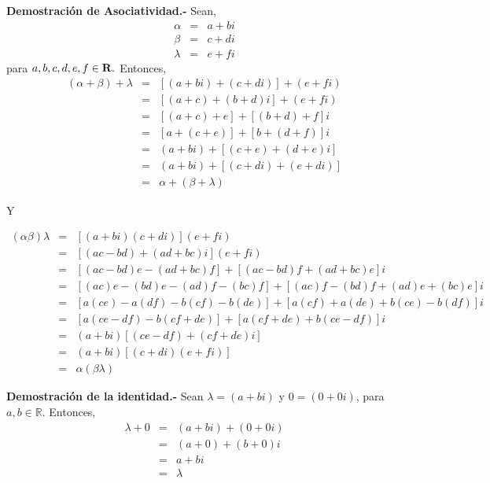 \textbf{Demostración de Asociatividad.-}\; Sean,
$$\begin{array}{rcl}
    \alpha & = & a+bi\\
    \beta & = & c+di\\
    \lambda & = & e+fi
\end{array}$$
para $a,b,c,d,e,f \in \bf{R}.$ Entonces,
$$\begin{array}{rcl}
    (\alpha + \beta )+\lambda & = & \left[(a+bi)+(c+di)\right]+(e+fi)\\
			      & = & \left[(a+c)+(b+d)i\right] + (e+fi)\\
			      & = & \left[(a+c)+e\right]+\left[(b+d)+f\right]i\\
			      & = & \left[a+(c+e)\right]+\left[b+(d+f)\right]i\\
			      & = & (a+bi) + \left[(c+e)+(d+e)i\right]\\
			      & = & (a+bi) + \left[(c+di)+(e+di)\right]\\
			      & = & \alpha + (\beta + \lambda)
\end{array}$$

Y

$$\begin{array}{rcl}
    (\alpha\beta)\lambda &=& \left[(a+bi)(c+di)\right](e+fi)\\
			 &=&\left[(ac-bd)+(ad+bc)i\right](e+fi)\\
			 &=&\left[(ac-bd)e-(ad+bc)f\right]+\left[(ac-bd)f+(ad+bc)e\right]i\\
			 &=&\left[(ac)e-(bd)e-(ad)f-(bc)f\right]+\left[(ac)f-(bd)f+(ad)e+(bc)e\right]i\\
			 &=&\left[a(ce)-a(df)-b(cf)-b(de)\right]+\left[a(cf)+a(de)+b(ce)-b(df)\right]i\\
			 &=&\left[a(ce-df)-b(cf+de)\right]+\left[a(cf+de)+b(ce-df)\right]i\\
			 &=&(a+bi)\left[(ce-df)+(cf+de)i\right]\\
			 &=&(a+bi)\left[(c+di)(e+fi)\right]\\
			 &=&\alpha(\beta\lambda)
\end{array}$$



\vspace{0.5cm}

\textbf{Demostración de la identidad.-}\; Sean $\lambda=(a+bi)$ y $0=(0+0i)$, para $a,b\in \mathbb{R}$. Entonces,
$$\begin{array}{rcl}
    \lambda +0 & = & (a+bi) + (0+0i)\\
	       & = & (a+0) + (b+0)i\\
	       & = & a + bi\\
	       & = & \lambda
\end{array}$$

